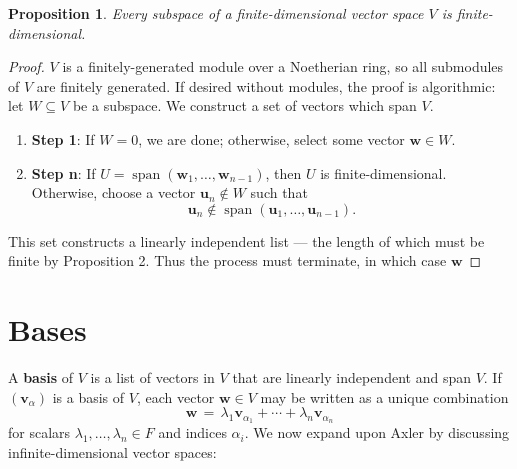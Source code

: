 \documentclass[11pt]{article}
\newtheorem{proposition}{Proposition}
\renewcommand{\vec}[1]{\mathbf{#1}}
\newcommand{\spn}{\operatorname{span}}
\begin{document}
\begin{adjustwidth}{0.5cm}{}
  \begin{proposition}
    Every subspace of a finite-dimensional vector space $V$ is finite-dimensional.
  \end{proposition}
  \begin{proof}
    $V$ is a finitely-generated module over a Noetherian ring, so all submodules of $V$ are finitely generated. If desired without modules, the proof is algorithmic: let $W \subseteq V$ be a subspace. We construct a set of vectors which span $V$.
    \begin{enumerate}
      \item \textbf{Step 1}: If $W = 0$, we are done; otherwise, select some vector $\vec{w} \in W$.
      \item \textbf{Step n}: If $U = \spn(\vec{w}_{1}, \ldots, \vec{w}_{n - 1})$, then $U$ is finite-dimensional. Otherwise, choose a vector $\vec{u}_{n} \notin W$ such that
      \[
        \vec{u}_{n} \notin \spn(\vec{u}_{1}, \ldots, \vec{u}_{n - 1}).
      \]
    \end{enumerate}
    This set constructs a linearly independent list --- the length of which must be finite by Proposition 2. Thus the process must terminate, in which case $\vec{w}$
  \end{proof}
\end{adjustwidth}


\section{Bases}

A \textbf{basis} of $V$ is a list of vectors in $V$ that are linearly independent and span $V$. If $(\vec{v}_{\alpha})$ is a basis of $V$, each vector $\vec{w} \in V$ may be written as a unique combination
\[
  \vec{w} \, = \, \lambda_{1} \vec{v}_{\alpha_{1}} + \cdots + \lambda_{n} \vec{v}_{\alpha_{n}}
\]
for scalars $\lambda_{1}, \ldots, \lambda_{n} \in F$ and indices $\alpha_{i}$. We now expand upon Axler by discussing infinite-dimensional vector spaces:
\end{document}
